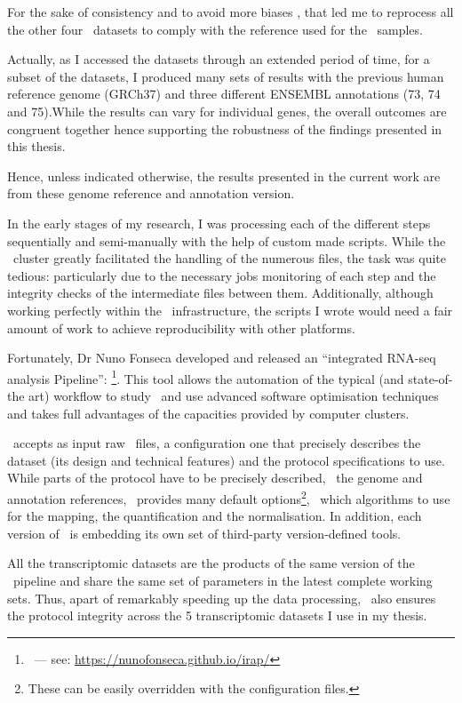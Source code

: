 For the sake of consistency and to avoid more biases \citep{h38vsh37},
that led me to reprocess all the other four \Rnaseq\ datasets
to comply with the reference used for the \Gtex\ samples.

Actually,
as I accessed the datasets through an extended period of time, for a subset of
the datasets, I produced many sets of results with the previous human reference
genome (GRCh37) and three different ENSEMBL annotations (73, 74 and 75).While the
results can vary for individual genes, the overall outcomes are congruent
together hence supporting the robustness of the findings presented in this thesis.

Hence, unless indicated otherwise, the results presented in the current work are
from these genome reference and annotation version.

In the early stages of my research, I was processing each of the different steps
sequentially and semi-manually with the help of custom made scripts.
While the \EBI\ cluster greatly facilitated the handling of the numerous files,
the task was quite tedious: particularly due to the necessary jobs monitoring of
each step and the integrity checks of the intermediate files between them.
Additionally, although working perfectly within the \EBI\ infrastructure,
the scripts I wrote would need a fair amount of work to achieve reproducibility
with other platforms.

Fortunately, Dr Nuno Fonseca developed and released
an ``integrated RNA-seq analysis Pipeline'': \irap\footnote{\irap\ ---
see: \href{https://nunofonseca.github.io/irap/}%
{https://nunofonseca.github.io/irap/}}.
This tool allows the automation of the typical
(and state-of-the art) workflow to study
\Rnaseq\ and use advanced software optimisation techniques and takes full
advantages of the capacities provided by computer clusters.

\irap\ accepts as input raw \Rnaseq\ files,
a configuration one that precisely describes the dataset (its design and
technical features) and the protocol specifications to use.
While parts of the protocol have to be precisely described, \eg\ the genome
and annotation references, \irap\ provides many default options\footnote{These
can be easily overridden with the configuration files.}, \eg\ which algorithms to
use for the mapping, the quantification and the normalisation.
In addition, each version of \irap\ is embedding its own set of third-party
version-defined tools.

All the transcriptomic datasets are the products of the same version of the \irap\
pipeline and share the same set of parameters in the latest complete working sets.
Thus, apart of remarkably speeding up the data processing, \irap\
also ensures the protocol integrity across the 5 transcriptomic datasets I
use in my thesis.


